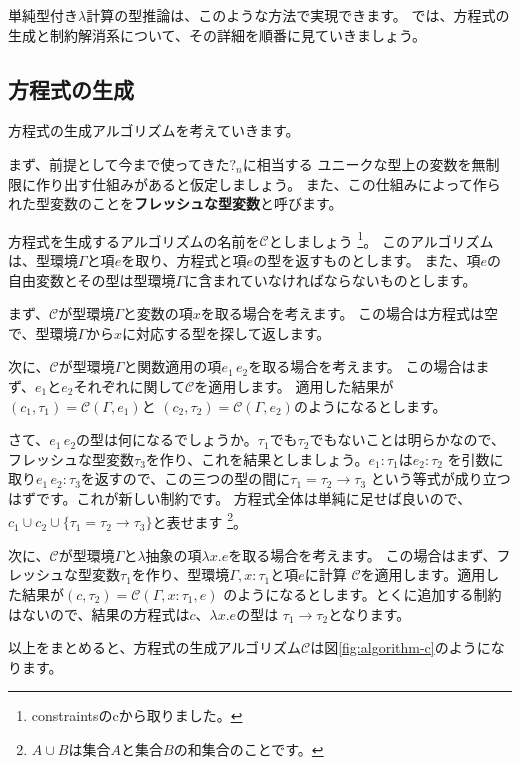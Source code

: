 単純型付き$\lambda$計算の型推論は、このような方法で実現できます。
では、方程式の生成と制約解消系について、その詳細を順番に見ていきましょう。

\subsection{方程式の生成}

方程式の生成アルゴリズムを考えていきます。

まず、前提として今まで使ってきた$?_n$に相当する
ユニークな型上の変数を無制限に作り出す仕組みがあると仮定しましょう。
また、この仕組みによって作られた型変数のことを\textbf{フレッシュな型変数}と呼びます。

方程式を生成するアルゴリズムの名前を$\mathcal C$としましょう
\footnote{constraintsのcから取りました。}。
このアルゴリズムは、型環境$\Gamma$と項$e$を取り、方程式と項$e$の型を返すものとします。
また、項$e$の自由変数とその型は型環境$\Gamma$に含まれていなければならないものとします。

まず、$\mathcal C$が型環境$\Gamma$と変数の項$x$を取る場合を考えます。
この場合は方程式は空で、型環境$\Gamma$から$x$に対応する型を探して返します。

次に、$\mathcal C$が型環境$\Gamma$と関数適用の項$e_1 \, e_2$を取る場合を考えます。
この場合はまず、$e_1$と$e_2$それぞれに関して$\mathcal C$を適用します。
適用した結果が$(c_1, \tau_1) = \mathcal{C}(\Gamma, e_1)$と
$(c_2, \tau_2) = \mathcal{C}(\Gamma, e_2)$のようになるとします。

さて、$e_1 \, e_2$の型は何になるでしょうか。$\tau_1$でも$\tau_2$でもないことは明らかなので、
フレッシュな型変数$\tau_3$を作り、これを結果としましょう。$e_1 : \tau_1$は$e_2 : \tau_2$
を引数に取り$e_1 \, e_2 : \tau_3$を返すので、この三つの型の間に$\tau_1 = \tau_2 \to \tau_3$
という等式が成り立つはずです。これが新しい制約です。
方程式全体は単純に足せば良いので、$c_1 \cup c_2 \cup \{\tau_1 = \tau_2 \to \tau_3\}$と表せます
\footnote{$A \cup B$は集合$A$と集合$B$の和集合のことです。}。

次に、$\mathcal C$が型環境$\Gamma$と$\lambda$抽象の項$\lambda x . e$を取る場合を考えます。
この場合はまず、フレッシュな型変数$\tau_1$を作り、型環境$\Gamma, x : \tau_1$と項$e$に計算
$\mathcal C$を適用します。適用した結果が$(c, \tau_2) = \mathcal{C}(\Gamma, x : \tau_1, e)$
のようになるとします。とくに追加する制約はないので、結果の方程式は$c$、$\lambda x . e$の型は
$\tau_1 \to \tau_2$となります。

以上をまとめると、方程式の生成アルゴリズム$\mathcal C$は図\ref{fig:algorithm-c}のようになります。

